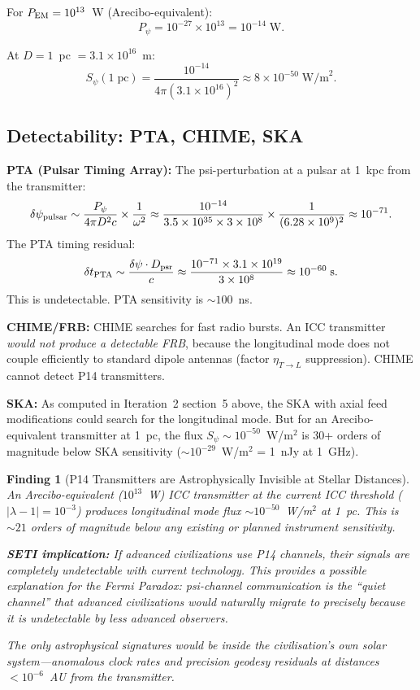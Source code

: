 \documentclass[11pt]{article}
\newtheorem{finding}{Finding}
\newcommand{\ee}[1]{\times 10^{#1}}
\begin{document}
For $P_{\rm EM} = 10^{13}$~W (Arecibo-equivalent):
\begin{equation}
P_\psi = 10^{-27} \times 10^{13} = 10^{-14}\;\text{W}.
\end{equation}

At $D = 1$~pc $= 3.1\ee{16}$~m:
\begin{equation}
S_\psi(1\;\text{pc}) = \frac{10^{-14}}{4\pi (3.1\ee{16})^2} \approx 8\ee{-50}\;\text{W/m}^2.
\end{equation}

\subsection{Detectability: PTA, CHIME, SKA}

\textbf{PTA (Pulsar Timing Array):}
The psi-perturbation at a pulsar at 1~kpc from the transmitter:
\begin{equation}
\delta\psi_{\rm pulsar} \sim \frac{P_\psi}{4\pi D^2 c} \times \frac{1}{\omega^2}
\approx \frac{10^{-14}}{3.5\ee{35} \times 3\ee{8}} \times \frac{1}{(6.28\ee9)^2}
\approx 10^{-71}.
\end{equation}
The PTA timing residual:
\begin{equation}
\delta t_{\rm PTA} \sim \frac{\delta\psi \cdot D_{\rm psr}}{c}
\approx \frac{10^{-71} \times 3.1\ee{19}}{3\ee{8}} \approx 10^{-60}\;\text{s}.
\end{equation}
This is undetectable. PTA sensitivity is $\sim 100$~ns.

\textbf{CHIME/FRB:}
CHIME searches for fast radio bursts. An ICC transmitter \textit{would
not produce a detectable FRB}, because the longitudinal mode does not
couple efficiently to standard dipole antennas (factor $\eta_{T\to L}$
suppression). CHIME cannot detect P14 transmitters.

\textbf{SKA:}
As computed in Iteration~2 section~5 above, the SKA with axial
feed modifications could search for the longitudinal mode.
But for an Arecibo-equivalent transmitter at 1~pc, the flux
$S_\psi \sim 10^{-50}$~W/m$^2$ is 30+ orders of magnitude below
SKA sensitivity ($\sim 10^{-29}$~W/m$^2$ = 1~nJy at 1~GHz).

\begin{finding}[P14 Transmitters are Astrophysically Invisible at Stellar Distances]
An Arecibo-equivalent ($10^{13}$~W) ICC transmitter at the current
ICC threshold ($|\lambda-1| = 10^{-3}$) produces longitudinal mode
flux $\sim 10^{-50}$~W/m$^2$ at 1~pc. This is $\sim 21$ orders of
magnitude below any existing or planned instrument sensitivity.

\textbf{SETI implication:} If advanced civilizations use P14 channels,
their signals are completely undetectable with current technology.
This provides a possible explanation for the Fermi Paradox: psi-channel
communication is the ``quiet channel'' that advanced civilizations
would naturally migrate to precisely because it is undetectable
by less advanced observers.

The only astrophysical signatures would be inside the civilisation's
own solar system---anomalous clock rates and precision geodesy
residuals at distances $< 10^{-6}$~AU from the transmitter.
\end{finding}
\end{document}
